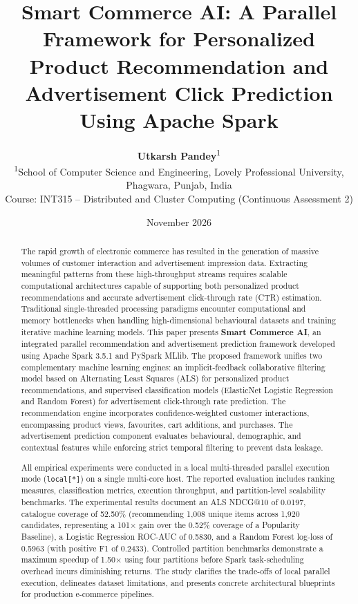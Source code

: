 \documentclass[10pt,a4paper,twoside]{article}
\title{\textbf{\Large Smart Commerce AI: A Parallel Framework for Personalized Product Recommendation and Advertisement Click Prediction Using Apache Spark}}
\author{
    \textbf{Utkarsh Pandey}\textsuperscript{1} \\
    \small \textsuperscript{1}School of Computer Science and Engineering, Lovely Professional University, Phagwara, Punjab, India \\
    \small Course: INT315 -- Distributed and Cluster Computing (Continuous Assessment 2)
}
\date{November 2026}
\begin{document}
\maketitle
\thispagestyle{plain}

\begin{abstract}
The rapid growth of electronic commerce has resulted in the generation of massive volumes of customer interaction and advertisement impression data. Extracting meaningful patterns from these high-throughput streams requires scalable computational architectures capable of supporting both personalized product recommendations and accurate advertisement click-through rate (CTR) estimation. Traditional single-threaded processing paradigms encounter computational and memory bottlenecks when handling high-dimensional behavioural datasets and training iterative machine learning models. This paper presents \textbf{Smart Commerce AI}, an integrated parallel recommendation and advertisement prediction framework developed using Apache Spark 3.5.1 and PySpark MLlib. The proposed framework unifies two complementary machine learning engines: an implicit-feedback collaborative filtering model based on Alternating Least Squares (ALS) for personalized product recommendations, and supervised classification models (ElasticNet Logistic Regression and Random Forest) for advertisement click-through rate prediction. The recommendation engine incorporates confidence-weighted customer interactions, encompassing product views, favourites, cart additions, and purchases. The advertisement prediction component evaluates behavioural, demographic, and contextual features while enforcing strict temporal filtering to prevent data leakage. 

All empirical experiments were conducted in a local multi-threaded parallel execution mode (\texttt{local[*]}) on a single multi-core host. The reported evaluation includes ranking measures, classification metrics, execution throughput, and partition-level scalability benchmarks. The experimental results document an ALS NDCG@10 of 0.0197, catalogue coverage of 52.50\% (recommending 1,008 unique items across 1,920 candidates, representing a 101$\times$ gain over the 0.52\% coverage of a Popularity Baseline), a Logistic Regression ROC-AUC of 0.5830, and a Random Forest log-loss of 0.5963 (with positive F1 of 0.2433). Controlled partition benchmarks demonstrate a maximum speedup of 1.50$\times$ using four partitions before Spark task-scheduling overhead incurs diminishing returns. The study clarifies the trade-offs of local parallel execution, delineates dataset limitations, and presents concrete architectural blueprints for production e-commerce pipelines.
\end{abstract}
\end{document}
